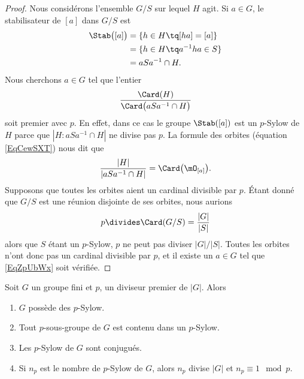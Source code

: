 \begin{proof}
    Nous considérons l'ensemble \( G/S\) sur lequel \( H\) agit. Si \( a\in G\), le stabilisateur de \( [a]\) dans \( G/S\) est
    \begin{subequations}
        \begin{align}
            \Stab\big( [a] \big)&=\{ h\in H\tq [ha]=[a] \}\\
            &=\{ h\in H\tq a^{-1}ha\in S\}\\
            &=aSa^{-1}\cap H.
        \end{align}
    \end{subequations}
    Nous cherchons \( a\in G\) tel que l'entier
    \begin{equation}        \label{EqZpUbWx}
        \frac{ \Card(H) }{ \Card\big( aSa^{-1}\cap H \big) }
    \end{equation}
    soit premier avec \( p\). En effet, dans ce cas le groupe \( \Stab([a])\) est un $p$-Sylow de \( H\) parce que \( | H:aSa^{-1}\cap H |\) ne divise pas \( p\). La formule des orbites (équation \eqref{EqCewSXT}) nous dit que
    \begin{equation}
        \frac{ | H | }{ | aSa^{-1}\cap H | }=\Card\big( \mO_{[a]} \big).
    \end{equation}
    Supposons que toutes les orbites aient un cardinal divisible par \( p\). Étant donné que \( G/S\) est une réunion disjointe de ses orbites, nous aurions
    \begin{equation}
        p\divides \Card(G/S)=\frac{ | G | }{ | S | }
    \end{equation}
    alors que \( S\) étant un $p$-Sylow, \( p\) ne peut pas diviser \( | G |/| S |\). Toutes les orbites n'ont donc pas un cardinal divisible par \( p\), et il existe un \( a\in G\) tel que \eqref{EqZpUbWx} soit vérifiée.
\end{proof}


\begin{theorem}  \label{ThoUkPDXf}
    Soit \( G\) un groupe fini et \( p\), un diviseur premier de \( | G |\). Alors
    \begin{enumerate}
        \item
            \( G\) possède des \( p\)-Sylow.
        \item
            Tout \( p\)-sous-groupe de \( G\) est contenu dans un \( p\)-Sylow.
        \item   \label{ItemMzNRVf}
            Les \( p\)-Sylow de \( G\) sont conjugués.
        \item   \label{ItemkYbdzZ}
            Si \( n_p\) est le nombre de $p$-Sylow de \( G\), alors \( n_p\) divise \( | G |\) et \( n_p\equiv 1\mod p\).
    \end{enumerate}
\end{theorem}

